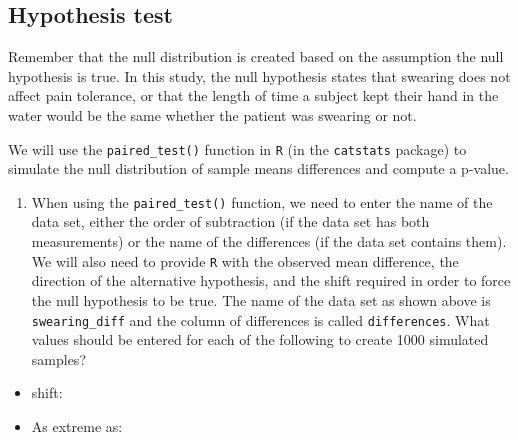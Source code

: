 \documentclass[
]{report}
\providecommand{\tightlist}{%
  \setlength{\itemsep}{0pt}\setlength{\parskip}{0pt}}
\begin{document}
\vspace{0.8in}

\hypertarget{hypothesis-test-1}{%
\subsection*{Hypothesis test}\label{hypothesis-test-1}}

Remember that the null distribution is created based on the assumption the null hypothesis is true. In this study, the null hypothesis states that swearing does not affect pain tolerance, or that the length of time a subject kept their hand in the water would be the same whether the patient was swearing or not.

We will use the \texttt{paired\_test()} function in \texttt{R} (in the \texttt{catstats} package) to simulate the null distribution of sample means differences and compute a p-value.

\begin{enumerate}
\def\labelenumi{\arabic{enumi}.}
\setcounter{enumi}{10}
\tightlist
\item
  When using the \texttt{paired\_test()} function, we need to enter the name of the data set, either the order of subtraction (if the data set has both measurements) or the name of the differences (if the data set contains them). We will also need to provide \texttt{R} with the observed mean difference, the direction of the alternative hypothesis, and the shift required in order to force the null hypothesis to be true. The name of the data set as shown above is \texttt{swearing\_diff} and the column of differences is called \texttt{differences}. What values should be entered for each of the following to create 1000 simulated samples?
\end{enumerate}

\vspace{1mm}

\begin{itemize}
\tightlist
\item
  shift:
\end{itemize}

\vspace{.2in}

\begin{itemize}
\tightlist
\item
  As extreme as:
\end{itemize}

\vspace{.2in}
\end{document}
